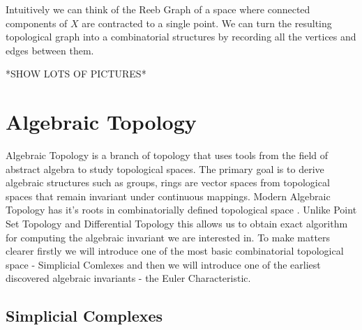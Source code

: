 Intuitively we can think of the Reeb Graph of a space where connected components of $X$ are contracted to a single point. We can turn the resulting topological graph into a combinatorial structures by recording all the vertices and edges between them.

*SHOW LOTS OF PICTURES*








\section{Algebraic Topology}


Algebraic Topology is a branch of topology that uses tools from the field of abstract algebra to study topological spaces. The primary goal is to derive algebraic structures such as groups, rings are vector spaces from topological spaces that remain invariant under continuous mappings. Modern Algebraic Topology has it's roots in combinatorially defined topological space \cite{comb-alg-topo}. Unlike Point Set Topology and Differential Topology this allows us to obtain exact algorithm for computing the algebraic invariant we are interested in. To make matters clearer firstly we will introduce one of the most basic combinatorial topological space - Simplicial Comlexes and then we will introduce one of the earliest discovered algebraic invariants - the Euler Characteristic.

\subsection{Simplicial Complexes}

